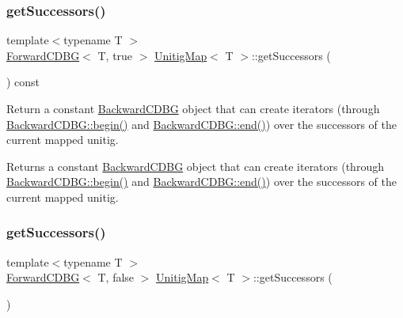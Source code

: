 \subsubsection{\texorpdfstring{get\+Successors()}{getSuccessors()}\hspace{0.1cm}{\footnotesize\ttfamily [1/2]}}
{\footnotesize\ttfamily template$<$typename T $>$ \\
\hyperlink{classForwardCDBG}{Forward\+C\+D\+BG}$<$ T, true $>$ \hyperlink{structUnitigMap}{Unitig\+Map}$<$ T $>$\+::get\+Successors (\begin{DoxyParamCaption}{ }\end{DoxyParamCaption}) const}



Return a constant \hyperlink{classBackwardCDBG}{Backward\+C\+D\+BG} object that can create iterators (through \hyperlink{classBackwardCDBG_ae7da438db925caebd02493ac7b1c01ab}{Backward\+C\+D\+B\+G\+::begin()} and \hyperlink{classBackwardCDBG_a898f45d400da7b0153644b5417b07657}{Backward\+C\+D\+B\+G\+::end()}) over the successors of the current mapped unitig. 

\begin{DoxyReturn}{Returns}
a constant \hyperlink{classBackwardCDBG}{Backward\+C\+D\+BG} object that can create iterators (through \hyperlink{classBackwardCDBG_ae7da438db925caebd02493ac7b1c01ab}{Backward\+C\+D\+B\+G\+::begin()} and \hyperlink{classBackwardCDBG_a898f45d400da7b0153644b5417b07657}{Backward\+C\+D\+B\+G\+::end()}) over the successors of the current mapped unitig. 
\end{DoxyReturn}
\mbox{\label{structUnitigMap_a4892fdd7f02c0b132b0164460159df9e}} 
\subsubsection{\texorpdfstring{get\+Successors()}{getSuccessors()}\hspace{0.1cm}{\footnotesize\ttfamily [2/2]}}
{\footnotesize\ttfamily template$<$typename T $>$ \\
\hyperlink{classForwardCDBG}{Forward\+C\+D\+BG}$<$ T, false $>$ \hyperlink{structUnitigMap}{Unitig\+Map}$<$ T $>$\+::get\+Successors (\begin{DoxyParamCaption}{ }\end{DoxyParamCaption})}



